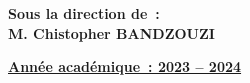 \begin{titlepage}
  \vspace{0.2cm}
  \begin{flushright}
    \large {
      \textbf {
        Sous la direction de : \\
        M. Chistopher BANDZOUZI
      }
    }
  \end{flushright}

  \vspace{1.5cm}
  \begin{center}
    \large {
      \textbf { \underline {Année académique : 2023 – 2024} }
    }

  \vspace*{\fill}
  \end{center}


\end{titlepage}
